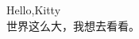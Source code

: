 \documentclass[12pt,a4paper]{article}
\begin{document}
{\noindent Hello,Kitty \\}
世界这么大，我想去看看。
\end{document}

